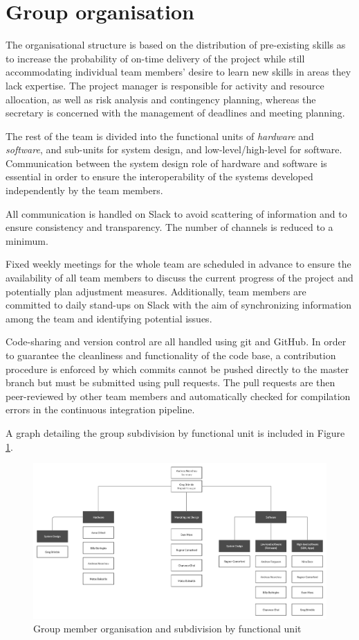 \documentclass{article}
\begin{document}
\section{Group organisation}

The organisational structure is based on the distribution of pre-existing skills as to increase the probability of on-time delivery of the project while still accommodating individual team members' desire to learn new skills in areas they lack expertise. The project manager is responsible for activity and resource allocation, as well as risk analysis and contingency planning, whereas the secretary is concerned with the management of deadlines and meeting planning.

The rest of the team is divided into the functional units of \emph{hardware} and \emph{software}, and sub-units for system design, and low-level/high-level for software. Communication between the system design role of hardware and software is essential in order to ensure the interoperability of the systems developed independently by the team members.

All communication is handled on Slack to avoid scattering of information and to ensure consistency and transparency. The number of channels is reduced to a minimum.

Fixed weekly meetings for the whole team are scheduled in advance to ensure the availability of all team members to discuss the current progress of the project and potentially plan adjustment measures. Additionally, team members are committed to daily stand-ups on Slack with the aim of synchronizing information among the team and identifying potential issues.

Code-sharing and version control are all handled using git and GitHub. In order to guarantee the cleanliness and functionality of the code base, a contribution procedure is enforced by which commits cannot be pushed directly to the master branch but must be submitted using pull requests. The pull requests are then peer-reviewed by other team members and automatically checked for compilation errors in the continuous integration pipeline.

A graph detailing the group subdivision by functional unit is included in Figure \ref{fig:organisation}.

\begin{figure}[h]
\vskip 5mm
\begin{center}
\centerline{\includegraphics[width=\textwidth]{figs/organisation3}}
\caption{Group member organisation and subdivision by functional unit}
\label{fig:organisation}
\end{center}
\vskip -5mm
\end{figure} 


\end{document}
